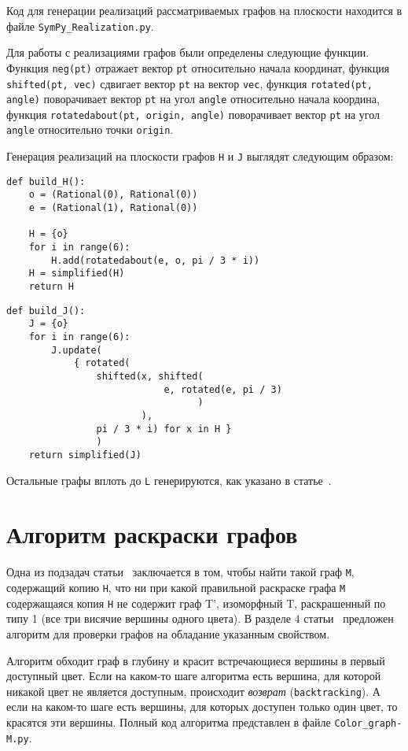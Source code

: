 Код для генерации реализаций рассматриваемых графов на плоскости находится в файле {\tt SymPy\_Realization.py}.

Для работы с реализациями графов были определены следующие функции. Функция {\tt neg(pt)} отражает вектор {\tt pt} относительно начала координат, функция {\tt shifted(pt, vec)} сдвигает вектор {\tt pt} на вектор {\tt vec}, функция {\tt rotated(pt, angle)} поворачивает вектор {\tt pt} на угол {\tt angle} относительно начала координа, функция {\tt rotatedabout(pt, origin, angle)} поворачивает вектор {\tt pt} на угол {\tt angle} относительно точки {\tt origin}.

Генерация реализаций на плоскости графов {\tt H} и {\tt J} выглядят следующим образом:

\begin{verbatim}
def build_H():
    o = (Rational(0), Rational(0))
    e = (Rational(1), Rational(0))

    H = {o}
    for i in range(6):
        H.add(rotatedabout(e, o, pi / 3 * i))
    H = simplified(H)
    return H
\end{verbatim}

\begin{verbatim}
def build_J():
    J = {o}
    for i in range(6):
        J.update(
            { rotated(
                shifted(x, shifted(
                            e, rotated(e, pi / 3)
                                  ) 
                        ),
                pi / 3 * i) for x in H }
                )
    return simplified(J)
\end{verbatim}

Остальные графы вплоть до {\tt L} генерируются, как указано в статье~\cite{deGrey}.

\section{Алгоритм раскраски графов}
Одна из подзадач статьи~\cite{deGrey} заключается в том, чтобы найти такой граф {\tt M}, содержащий копию {\tt H}, что ни при какой правильной раскраске графа {\tt M} содержащаяся копия {\tt H} не содержит граф T', изоморфный T, раскрашенный по типу 1 (все три висячие вершины одного цвета).
В разделе 4 статьи~\cite{deGrey} предложен алгоритм для проверки графов на обладание указанным свойством.

Алгоритм обходит граф в глубину и красит встречающиеся вершины в первый доступный цвет. Если на каком-то шаге алгоритма есть вершина, для которой никакой цвет не является доступным, происходит {\it возврат} ({\tt backtracking}). А если на каком-то шаге есть вершины, для которых доступен только один цвет, то красятся эти вершины. Полный код алгоритма представлен в файле {\tt Color\_graph-M.py}.


